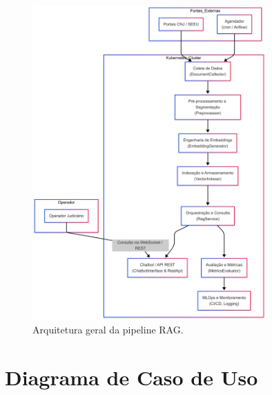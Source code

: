 \begin{figure}[h!]
  \centering
  \includegraphics[width=0.8\textwidth]{04-figuras/arquitetura_pipeline.png}
  \caption{Arquitetura geral da pipeline RAG.}
  \label{fig:arquitetura_pipeline}
\end{figure}

\section{Diagrama de Caso de Uso}
\label{sec:diagrama-caso-uso}

